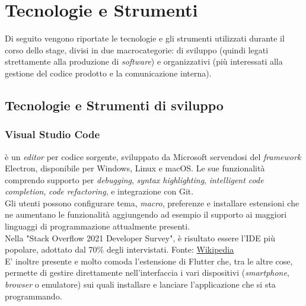 \section{Tecnologie e Strumenti}
\label{sec:tecnologie-e-strumenti}
Di seguito vengono riportate le tecnologie e gli strumenti utilizzati durante il corso dello stage, divisi in due macrocategorie: di sviluppo (quindi legati strettamente alla produzione di \textit{software}) e organizzativi (più interessati alla gestione del codice prodotto e la comunicazione interna).

\subsection{Tecnologie e Strumenti di sviluppo}

\subsubsection{Visual Studio Code}
\vsc{} è un \textit{editor} per codice sorgente, sviluppato da Microsoft servendosi del \textit{framework} Electron, disponibile per Windows, Linux e macOS. Le sue funzionalità comprendo supporto per \textit{debugging}, \textit{syntax highlighting}, \textit{intelligent code completion}, \textit{code refactoring}, e integrazione con Git. \\
Gli utenti possono configurare tema, \textit{macro}, preferenze e installare estensioni che ne aumentano le funzionalità aggiungendo ad esempio il supporto ai maggiori linguaggi di programmazione attualmente presenti.\\
Nella "Stack Overflow 2021 Developer Survey", \vsc{} è risultato essere l'IDE più popolare, adottato dal 70\% degli intervistati. {\tiny Fonte: \href{https://en.wikipedia.org/wiki/Visual_Studio_Code}{Wikipedia}}\\
E' inoltre presente e molto comoda l'estensione di Flutter che, tra le altre cose, permette di gestire direttamente nell'interfaccia i vari dispositivi (\textit{smartphone}, \textit{browser} o emulatore) sui quali installare e lanciare l'applicazione che si sta programmando.


